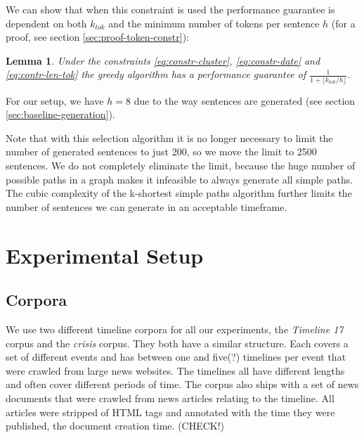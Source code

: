 \documentclass[a4paper,BCOR=10mm]{report}
\newtheorem{lemma}{Lemma}
\numberwithin{lemma}{chapter}
\numberwithin{definition}{chapter}
\begin{document}
We can show that when this constraint is used the performance guarantee is dependent on both $k_{tok}$ and the minimum number of tokens per sentence $h$ (for a proof, see section \ref{sec:proof-token-constr}):
\begin{lemma}
Under the constraints \ref{eq:constr-cluster}, \ref{eq:constr-date} and \ref{eq:contr-len-tok} the greedy algorithm has a performance guarantee of $\frac{1}{1 + \lfloor k_{\mathit{tok}} / h \rfloor}$.
\end{lemma}

For our setup, we have $h = 8$ due to the way sentences are generated (see section \ref{sec:baseline-generation}).





Note that with this selection algorithm it is no longer necessary to limit the number of generated sentences to just 200, so we move the limit to 2500 sentences.
We do not completely eliminate the limit, because the huge number of possible paths in a graph makes it infeasible to always generate all simple paths. The cubic complexity of the k-shortest simple paths algorithm further limits the number of sentences we can generate in an acceptable timeframe.

\chapter{Experimental Setup}

\section{Corpora} \label{sec:corpora}

We use two different timeline corpora for all our experiments, the \textit{Timeline 17} corpus \citet{tran-tl17} and the \textit{crisis} corpus. They both have a similar structure. Each covers a set of different events and has between one and five(?) timelines per event that were crawled from large news websites. The timelines all have different lengths and often cover different periods of time. The corpus also ships with a set of news documents that were crawled from news articles relating to the timeline. All articles were stripped of HTML tags and annotated with the time they were published, the document creation time. (CHECK!)
\end{document}
